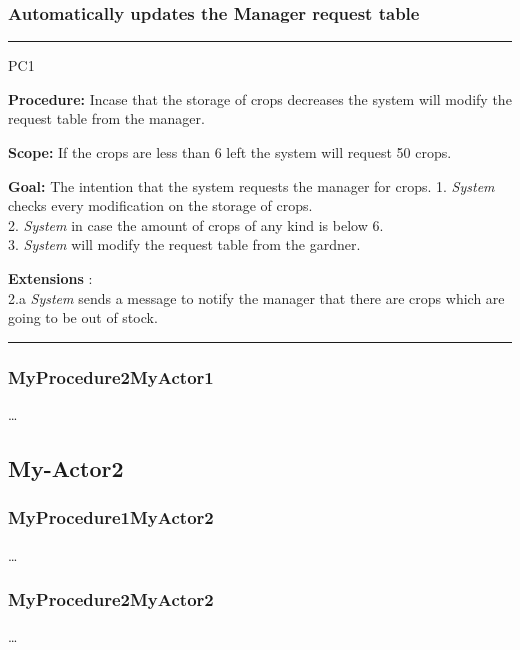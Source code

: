\subsubsection{Automatically updates the Manager request table}
\vspace{0.5cm}
\hrule
\hfill \break
\begin{lyxlist}{PC1}
\small{
\item [\textbf{Procedure:}] Incase that the storage of crops decreases the
system will modify the request table from the manager.
\item [\textbf{Scope:}] If the crops are less than 6 left the system will
request 50 crops.
\item [\textbf{Goal:}] The intention that the system requests the manager for
crops.
1. \emph{System} checks every modification on the storage of crops. \\
2. \emph{System} in case the amount of crops of any kind is below 6.\\
3. \emph{System} will modify the request table from the gardner.\\
\item [\textbf{Extensions}]:\\
2.a  \emph{System} sends a message to notify the manager that there are crops
which are going to be out of stock.\\
}
\end{lyxlist}
\hrule
\vspace{0.5cm}


\subsubsection{MyProcedure2MyActor1}
\ldots


\subsection{My-Actor2}

\subsubsection{MyProcedure1MyActor2}
\ldots

\subsubsection{MyProcedure2MyActor2}
\ldots














